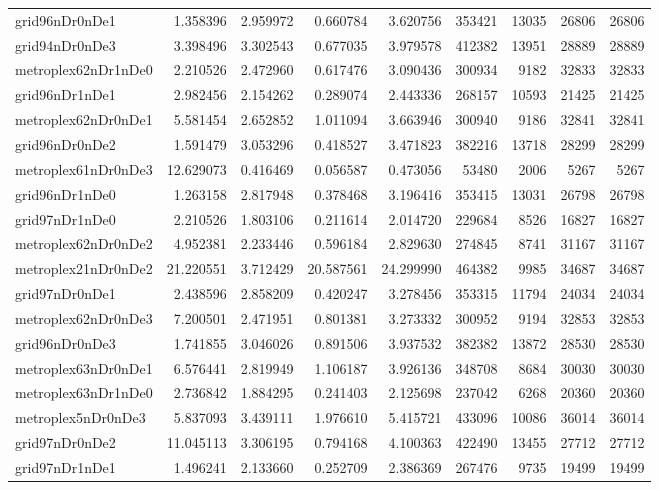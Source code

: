 \documentclass[../../../thesis.tex]{subfiles}
\begin{document}
\begin{longtable}{|l|r|r|r|r|r|r|r|r|}
grid96nDr0nDe1 & 1.358396 & 2.959972 & 0.660784 & 3.620756 & 353421 & 13035 & 26806 & 26806 \\
grid94nDr0nDe3 & 3.398496 & 3.302543 & 0.677035 & 3.979578 & 412382 & 13951 & 28889 & 28889 \\
metroplex62nDr1nDe0 & 2.210526 & 2.472960 & 0.617476 & 3.090436 & 300934 & 9182 & 32833 & 32833 \\
grid96nDr1nDe1 & 2.982456 & 2.154262 & 0.289074 & 2.443336 & 268157 & 10593 & 21425 & 21425 \\
metroplex62nDr0nDe1 & 5.581454 & 2.652852 & 1.011094 & 3.663946 & 300940 & 9186 & 32841 & 32841 \\
grid96nDr0nDe2 & 1.591479 & 3.053296 & 0.418527 & 3.471823 & 382216 & 13718 & 28299 & 28299 \\
metroplex61nDr0nDe3 & 12.629073 & 0.416469 & 0.056587 & 0.473056 & 53480 & 2006 & 5267 & 5267 \\
grid96nDr1nDe0 & 1.263158 & 2.817948 & 0.378468 & 3.196416 & 353415 & 13031 & 26798 & 26798 \\
grid97nDr1nDe0 & 2.210526 & 1.803106 & 0.211614 & 2.014720 & 229684 & 8526 & 16827 & 16827 \\
metroplex62nDr0nDe2 & 4.952381 & 2.233446 & 0.596184 & 2.829630 & 274845 & 8741 & 31167 & 31167 \\
metroplex21nDr0nDe2 & 21.220551 & 3.712429 & 20.587561 & 24.299990 & 464382 & 9985 & 34687 & 34687 \\
grid97nDr0nDe1 & 2.438596 & 2.858209 & 0.420247 & 3.278456 & 353315 & 11794 & 24034 & 24034 \\
metroplex62nDr0nDe3 & 7.200501 & 2.471951 & 0.801381 & 3.273332 & 300952 & 9194 & 32853 & 32853 \\
grid96nDr0nDe3 & 1.741855 & 3.046026 & 0.891506 & 3.937532 & 382382 & 13872 & 28530 & 28530 \\
metroplex63nDr0nDe1 & 6.576441 & 2.819949 & 1.106187 & 3.926136 & 348708 & 8684 & 30030 & 30030 \\
metroplex63nDr1nDe0 & 2.736842 & 1.884295 & 0.241403 & 2.125698 & 237042 & 6268 & 20360 & 20360 \\
metroplex5nDr0nDe3 & 5.837093 & 3.439111 & 1.976610 & 5.415721 & 433096 & 10086 & 36014 & 36014 \\
grid97nDr0nDe2 & 11.045113 & 3.306195 & 0.794168 & 4.100363 & 422490 & 13455 & 27712 & 27712 \\
grid97nDr1nDe1 & 1.496241 & 2.133660 & 0.252709 & 2.386369 & 267476 & 9735 & 19499 & 19499 \\

\end{longtable}
\end{document}
